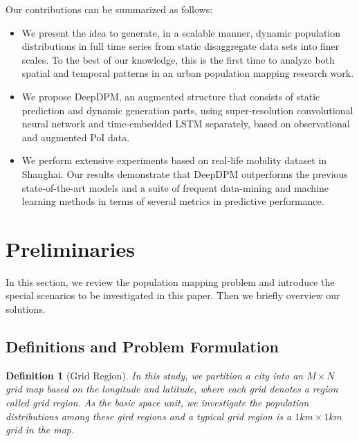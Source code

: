 \documentclass[letterpaper]{article} %
\newtheorem{mdefinition}{Definition}
\begin{document}
Our contributions can be summarized as follows:
\begin{itemize}
    \item We present the idea to generate, in a scalable manner, dynamic population distributions in full time series from static disaggregate data sets into finer scales. To the best of our knowledge, this is the first time to analyze both spatial and temporal patterns in an urban population mapping research work.
    
    \item We propose DeepDPM, an augmented structure that consists of static prediction and dynamic generation parts, using super-resolution convolutional neural network and time-embedded LSTM separately, based on observational and augmented PoI data.
    
    \item We perform extensive experiments based on real-life mobility dataset in Shanghai. Our results demonstrate that DeepDPM outperforms the previous state-of-the-art models and a suite of frequent data-mining and machine learning methods in terms of several metrics in predictive performance.

\end{itemize}


\section{Preliminaries}
In this section, we review the population mapping problem and introduce the special scenarios to be investigated in this paper. Then we briefly overview our solutions.

\subsection{Definitions and Problem Formulation}

\begin{mdefinition}[Grid Region]
In this study, we partition a city into an $M{\times}N$ grid map based on the longitude and latitude, where each grid denotes a region called grid region. As the basic space unit, we investigate the population distributions among these gird regions and a typical grid region is a $1km{\times}1km$ grid in the map.
\end{mdefinition}
\end{document}
